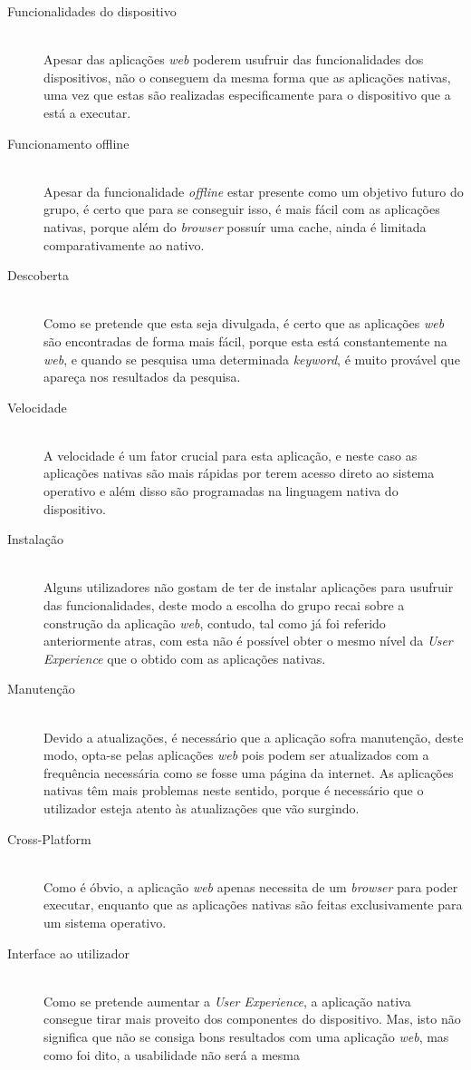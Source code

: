 \begin{description}
  \item[Funcionalidades do dispositivo] \hfill \\
  Apesar das aplicações \textit{web} poderem usufruir das funcionalidades dos dispositivos, não o conseguem da mesma forma que as aplicações nativas, uma vez que estas são realizadas especificamente para o dispositivo que a está a executar.
  \item[Funcionamento offline] \hfill \\
  Apesar da funcionalidade \textit{offline} estar presente como um objetivo futuro do grupo, é certo que para se conseguir isso, é mais fácil com as aplicações nativas, porque além do \textit{browser} possuír uma cache, ainda é limitada comparativamente ao nativo.
  \item[Descoberta] \hfill \\
  Como se pretende que esta seja divulgada, é certo que as aplicações \textit{web} são encontradas de forma mais fácil, porque esta está constantemente na \textit{web}, e quando se pesquisa uma determinada \textit{keyword}, é muito provável que apareça nos resultados da pesquisa.
  \item[Velocidade] \hfill \\
  A velocidade é um fator crucial para esta aplicação, e neste caso as aplicações nativas são mais rápidas por terem acesso direto ao sistema operativo e além disso são programadas na linguagem nativa do dispositivo.
  \item[Instalação] \hfill \\
  Alguns utilizadores não gostam de ter de instalar aplicações para usufruir das funcionalidades, deste modo a escolha do grupo recai sobre a construção da aplicação \textit{web}, contudo, tal como já foi referido anteriormente atras, com esta não é possível obter o mesmo nível da \textit{User Experience} que o obtido com as aplicações nativas.
  \item[Manutenção] \hfill \\
  Devido a atualizações, é necessário que a aplicação sofra manutenção, deste modo, opta-se pelas aplicações \textit{web} pois podem ser atualizados com a frequência necessária como se fosse uma página da internet. As aplicações nativas têm mais problemas neste sentido, porque é necessário que o utilizador esteja atento às atualizações que vão surgindo.
  \item[Cross-Platform] \hfill \\
  Como é óbvio, a aplicação \textit{web} apenas necessita de um \textit{browser} para poder executar, enquanto que as aplicações nativas são feitas exclusivamente para um sistema operativo.
  \item[Interface ao utilizador] \hfill \\
  Como se pretende aumentar a \textit{User Experience}, a aplicação nativa consegue tirar mais proveito dos componentes do dispositivo. Mas, isto não significa que não se consiga bons resultados com uma aplicação \textit{web}, mas como foi dito, a usabilidade não será a mesma
\end{description}


